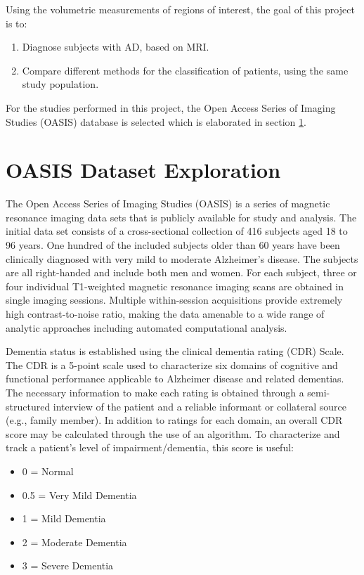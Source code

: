 Using the volumetric measurements of regions of interest, the goal of this project is to:
\begin{enumerate}
	\item Diagnose subjects with AD, based on MRI.
	\item Compare different methods for the classification of patients, using the same study population.
\end{enumerate}

For the studies performed in this project, the Open Access Series of Imaging Studies (OASIS) database is selected which is elaborated in section \ref{sec:oasis}. 




\section{OASIS Dataset Exploration}
\label{sec:oasis}
The Open Access Series of Imaging Studies (OASIS) is a series of magnetic  resonance  imaging  data  sets  that  is  publicly  available  for study and analysis. The initial data set consists of a cross-sectional collection of 416 subjects aged 18 to 96 years. One hundred of the  included  subjects  older  than  60  years  have  been  clinically diagnosed with very mild to moderate Alzheimer’s disease. The subjects are all right-handed and include both men and women. For each subject, three or four individual T1-weighted magnetic
resonance imaging scans are obtained in single imaging sessions. Multiple within-session acquisitions provide extremely high contrast-to-noise ratio, making the data amenable to a wide range of analytic approaches including automated computational analysis.

Dementia  status  is  established using  the
clinical dementia rating (CDR) Scale. The CDR is a 5-point scale used to characterize six domains of cognitive and functional performance applicable to Alzheimer disease and related dementias. The necessary information to make each rating is obtained through a semi-structured interview of the patient and a reliable informant or collateral source (e.g., family member). In addition to ratings for each domain, an overall CDR score may be calculated through the use of an algorithm. To characterize and track a patient's level of impairment/dementia, this score is useful:

\begin{itemize}
	\item 0 = Normal
	\item 0.5 = Very Mild Dementia
	\item 1 = Mild Dementia
	\item 2 = Moderate Dementia
	\item 3 = Severe Dementia
\end{itemize}


